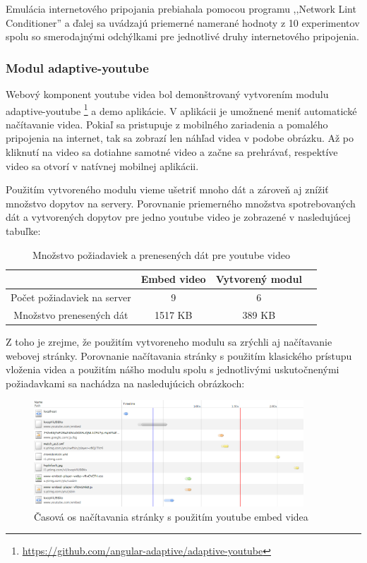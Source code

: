 Emulácia internetového pripojania prebiahala pomocou programu ,,Network Lint Conditioner'' a ďalej sa uvádzajú priemerné namerané hodnoty z 10 experimentov spolu so smerodajnými odchýlkami pre jednotlivé druhy internetového pripojenia.

\subsubsection{Modul adaptive-youtube} %
\label{sub:adaptive_youtube}

Webový komponent youtube videa bol demonštrovaný vytvorením modulu adaptive-youtube \footnote{\url{https://github.com/angular-adaptive/adaptive-youtube}} a demo aplikácie. V aplikácii je umožnené meniť automatické načítavanie videa. Pokiaľ sa pristupuje z mobilného zariadenia a pomalého pripojenia na internet, tak sa zobrazí len náhľad videa v podobe obrázku. Až po kliknutí na video sa dotiahne samotné video a začne sa prehrávať, respektíve video sa otvorí v natívnej mobilnej aplikácii.

Použitím vytvoreného modulu vieme ušetriť mnoho dát a zároveň aj znížiť množstvo dopytov na servery. Porovnanie priemerného množstva spotrebovaných dát a vytvorených dopytov pre jedno youtube video je zobrazené v nasledujúcej tabuľke:

\begin{table}[H]
  \begin{tabular}{ |c|c|c|c| }
    \hline
    & Embed video & Vytvorený modul \\ \hline
    Počet požiadaviek na server & 9 & 6 \\  \hline
    Množstvo prenesených dát  & 1517 KB & 389 KB  \\
    \hline
  \end{tabular}
  \caption[Množstvo požiadaviek a prenesených dát pre youtube video]{Množstvo požiadaviek a prenesených dát pre youtube video}
\end{table}

Z toho je zrejme, že použitím vytvoreneho modulu sa zrýchli aj načítavanie webovej stránky. Porovnanie načítavania stránky s použitím klasického prístupu vloženia videa a použitím nášho modulu spolu s jednotlivými uskutočnenými požiadavkami sa nachádza na nasledujúcich obrázkoch:

\begin{figure}[H]
  \centering
  \includegraphics[width=0.9\textwidth]{img/load/timeline-y-e.png}
  \caption[Časová os načítavania stránky s použitím youtube embed videa]{
    Časová os načítavania stránky s použitím youtube embed videa}
  \label{fig: timeline-y-e}
\end{figure}

